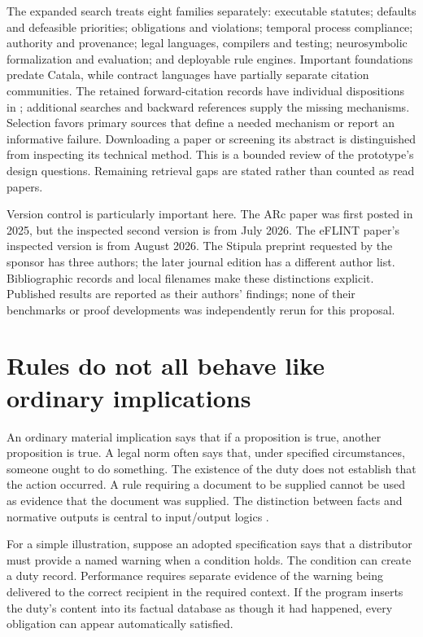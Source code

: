 \documentclass[12pt,a4paper,oneside,openany]{book}
\begin{document}
The expanded search treats eight families separately: executable statutes;
defaults and defeasible priorities; obligations and violations; temporal process
compliance; authority and provenance; legal languages, compilers and testing;
neurosymbolic formalization and evaluation; and deployable rule engines. Important
foundations predate Catala, while contract languages have partially separate
citation communities. The retained forward-citation records have individual
dispositions in ; additional searches and backward
references supply the missing mechanisms. Selection favors primary sources that
define a needed mechanism or report an informative failure. Downloading a paper
or screening its abstract is distinguished from inspecting its technical method.
This is a bounded review of the prototype's design questions. Remaining retrieval
gaps are stated rather than counted as read papers.

Version control is particularly important here. The ARc paper was first posted
in 2025, but the inspected second version is from July 2026. The eFLINT paper's
inspected version is from August 2026. The Stipula preprint requested by the
sponsor has three authors; the later journal edition has a different author list.
Bibliographic records and local filenames make these distinctions explicit.
Published results are reported as their authors' findings; none of their
benchmarks or proof developments was independently rerun for this proposal.

\section{Rules do not all behave like ordinary implications}
\label{merge:M04:01}

\label{sec:languages-norms}
An ordinary material implication says that if a proposition is true, another
proposition is true. A legal norm often says that, under specified circumstances,
someone ought to do something. The existence of the duty does not establish
that the action occurred. A rule requiring a document to be supplied cannot
be used as evidence that the document was supplied. The distinction between
facts and normative outputs is central to input/output logics
\citep[secs.~2--4]{inputoutput2000}.

For a simple illustration, suppose an adopted specification says that a
distributor must provide a named warning when a condition holds. The condition
can create a duty record. Performance requires separate evidence of the
warning being delivered to the correct recipient in the required context.
If the program inserts the duty's content into its factual database as though
it had happened, every obligation can appear automatically satisfied.
\end{document}
